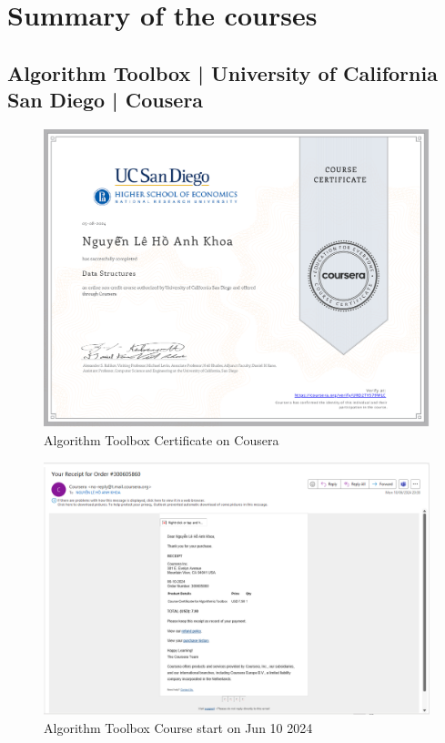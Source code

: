 \section{Summary of the courses}
\subsection{Algorithm Toolbox |
	University of California San Diego | Cousera}

\begin{figure}[H]
	\centering
	\includegraphics[width=0.7\linewidth]{img/Cert01.png}
	\caption{Algorithm Toolbox Certificate on Cousera}
	\label{fig:algorithmtoolbox}
\end{figure}

\begin{figure}[H]
	\centering
	\includegraphics[width=0.7\linewidth]{img/Capture01.PNG}
	\caption{Algorithm Toolbox Course start on Jun 10 2024}
	\label{fig:algorithmtoolbox}
\end{figure}

